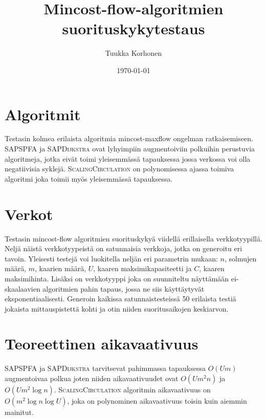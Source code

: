 \documentclass[a4paper, 11pt]{article}
\title{Mincost-flow-algoritmien suorituskykytestaus}
\author{Tuukka Korhonen}
\date{\today}
\begin{document}
\maketitle
\noindent

\section*{Algoritmit}
Testasin kolmea erilaista algoritmia mincost-maxflow ongelman ratkaisemiseen. 
\textsc{SAPSPFA} ja 
\textsc{SAPDijkstra} ovat lyhyimpiin augmentoiviin polkuihin perustuvia algoritmeja, jotka eivät toimi
yleisemmässä tapauksessa jossa verkossa voi olla negatiivisia syklejä. \textsc{ScalingCirculation} on
polynomisessa ajassa toimiva algoritmi joka toimii myös yleisemmässä tapauksessa.

\section*{Verkot}
Testasin mincost-flow algoritmien suorituskykyä viidellä erillaisella verkkotyypillä.
Neljä näistä verkkotyypeistä on satunnaisia verkkoja, jotka on generoitu eri tavoin. 
Yleisesti testejä voi luokitella neljän eri parametrin mukaan:
$n$, solmujen määrä, $m$, kaarien määrä, $U$, kaaren maksimikapasiteetti ja
$C$, kaaren maksimihinta. Lisäksi on verkkotyyppi joka on suunniteltu näyttämään 
ei-skaalaavien algoritmien pahin tapaus, jossa ne siis käyttäytyvät eksponentiaalisesti.
Generoin kaikissa satunnaistesteissä 50 erilaista testiä jokaista mittauspistettä kohti ja otin niiden suoritusaikojen
keskiarvon.

\section*{Teoreettinen aikavaativuus}
 \textsc{SAPSPFA} ja 
\textsc{SAPDijkstra} tarvitsevat pahimmassa tapauksessa $O(Um)$ augmentoivaa polkua joten niiden
aikavaativuudet ovat $O(Um^2 n)$ ja $O(Um^2 \log n)$. \textsc{ScalingCirculation} algoritmin
aikavaativuus on $O(m^2 \log n \log U)$, joka on polynominen aikavaativuus toisin kuin aiemmin mainitut.
\end{document}
